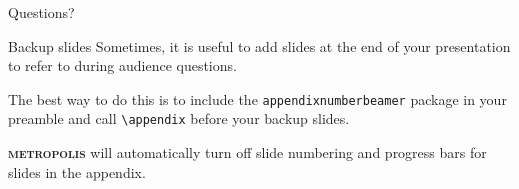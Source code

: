 \documentclass[10pt]{beamer}
\newcommand{\themename}{\textbf{\textsc{metropolis}}\xspace}
\begin{document}
{
\begin{frame}[standout]
  Questions?
\end{frame}
}

\begin{frame}[fragile]{Backup slides}
  Sometimes, it is useful to add slides at the end of your presentation to
  refer to during audience questions.

  The best way to do this is to include the \verb|appendixnumberbeamer|
  package in your preamble and call \verb|\appendix| before your backup slides.

  \themename will automatically turn off slide numbering and progress bars for
  slides in the appendix.
\end{frame}
\end{document}

